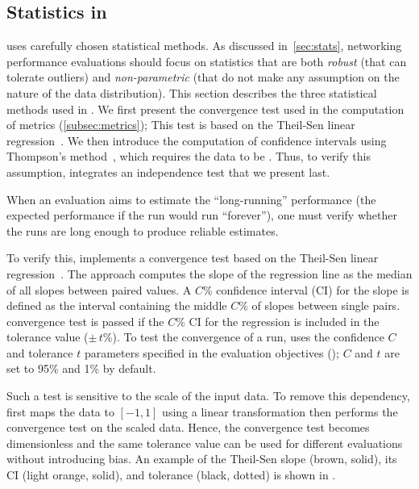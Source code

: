 \subsection{Statistics in \triscale}
\label{subsec:triscale_stats}

\triscale uses carefully chosen statistical methods.
As discussed in~\cref{sec:stats}, networking performance evaluations should focus on statistics that are both \emph{robust} (\ie that can tolerate outliers) and \emph{non-parametric} (\ie that do not make any assumption on the nature of the data distribution).
This section describes the three statistical methods used in \triscale. We first present the convergence test used in the computation of metrics (\cref{subsec:metrics});
This test is based on the \mbox{Theil-Sen} linear regression~\cite{theil1992RankInvariant, sen1968Estimates}.
We then introduce the computation of confidence intervals using Thompson's method~\cite{thompson1936Confidence}, which requires the data to be \iid. Thus, to verify this assumption, \triscale integrates an independence test that we present last.

\label{subsec:test_convergence}
When an evaluation aims to estimate the ``long-running'' performance (\ie the expected performance if the run would run “forever”), one must verify whether the runs are long enough to produce reliable estimates.

To verify this, \triscale implements a convergence test based on the Theil-Sen linear regression~\cite{theil1992RankInvariant, sen1968Estimates}.
The approach computes the slope of the regression line as the median of all slopes between paired values.
A $C$\% confidence interval (CI) for the slope is defined as the interval containing the middle $C$\% of slopes between single pairs.
\triscale convergence test is passed if the $C$\% CI for the regression is included in the tolerance value ($\pm$\,$t$\%).
To test the convergence of a run, \triscale uses the confidence $C$ and tolerance $t$ parameters specified in the evaluation objectives (); $C$ and $t$ are set to 95\% and 1\% by default.

Such a test is sensitive to the scale of the input data.
To remove this dependency, \triscale first maps the data to $[-1, 1]$ using a linear transformation then performs the convergence test on the scaled data.
Hence, the convergence test becomes dimensionless and the same tolerance value can be used for different evaluations without introducing bias.
An example of the Theil-Sen slope (brown, solid), its CI (light orange, solid), and tolerance (black, dotted) is shown in .

